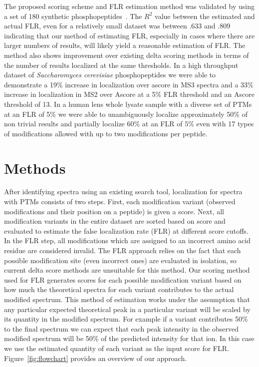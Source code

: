\documentclass[11pt]{article}
\begin{document}
The proposed scoring scheme and FLR estimation method was validated by using a set of 180 synthetic phosphopeptides~\cite{savitski11}. The $R^2$ value between the estimated and actual FLR, even for a relatively small dataset was between $.633$ and $.809$ indicating that our method of estimating FLR, especially in cases where there are larger numbers of results, will likely yield a reasonable estimation of FLR. The method also shows improvement over existing delta scoring methods in terms of the number of results localized at the same thresholds. In a high throughput dataset of \emph{Saccharomyces  cerevisiae} phosphopeptides we were able to demonstrate a 19\% increase in localization over ascore in MS3 spectra and a 33\% increase in localization in MS2 over Ascore at a 5\% FLR threshold and an Ascore threshold of 13. In a human lens whole lysate sample with a diverse set of PTMs at an FLR of 5\% we were able to unambiguously localize approximately 50\% of non trivial results and partially localize 60\%  at an FLR of $5\%$ even with 17 types of modifications allowed with up to two modifications per peptide.

\section{Methods}
After identifying spectra using an existing search tool, localization for spectra with PTMs consists of two steps. First, each modification variant (observed modifications and their position on a peptide) is given a score. Next, all modification variants in the entire dataset are sorted based on score and evaluated to estimate the false localization rate (FLR) at different score cutoffs. In the FLR step, all modifications which are assigned to an incorrect amino acid residue are considered invalid. The FLR approach relies on the fact that each possible modification site (even incorrect ones) are evaluated in isolation, so current delta score methods are unsuitable for this method. Our scoring method used for FLR generates scores for each possible modification variant based on how much the theoretical spectra for each variant contributes to the actual modified spectrum. This method of estimation works under the assumption that any particular expected theoretical peak in a particular variant will be scaled by its quantity in the modified spectrum. For example if a variant contributes 50\% to the final spectrum we can expect that each peak intensity in the observed modified spectrum will be 50\% of the predicted intensity for that ion. In this case we use the estimated quantity of each variant as the input score for FLR. Figure~\ref{fig:flowchart} provides an overview of our approach.
\end{document}
